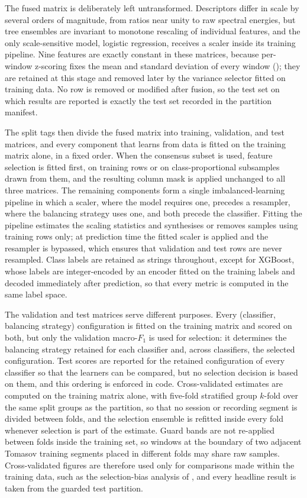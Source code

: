 The fused matrix is deliberately left untransformed. Descriptors differ in scale by several orders of magnitude, from ratios near unity to raw spectral energies, but tree ensembles are invariant to monotone rescaling of individual features, and the only scale-sensitive model, logistic regression, receives a scaler inside its training pipeline. Nine features are exactly constant in these matrices, because per-window z-scoring fixes the mean and standard deviation of every window (); they are retained at this stage and removed later by the variance selector fitted on training data. No row is removed or modified after fusion, so the test set on which results are reported is exactly the test set recorded in the partition manifest.

The split tags then divide the fused matrix into training, validation, and test matrices, and every component that learns from data is fitted on the training matrix alone, in a fixed order. When the consensus subset is used, feature selection is fitted first, on training rows or on class-proportional subsamples drawn from them, and the resulting column mask is applied unchanged to all three matrices. The remaining components form a single imbalanced-learning pipeline in which a scaler, where the model requires one, precedes a resampler, where the balancing strategy uses one, and both precede the classifier. Fitting the pipeline estimates the scaling statistics and synthesises or removes samples using training rows only; at prediction time the fitted scaler is applied and the resampler is bypassed, which ensures that validation and test rows are never resampled. Class labels are retained as strings throughout, except for XGBoost, whose labels are integer-encoded by an encoder fitted on the training labels and decoded immediately after prediction, so that every metric is computed in the same label space.

The validation and test matrices serve different purposes. Every (classifier, balancing strategy) configuration is fitted on the training matrix and scored on both, but only the validation macro-$F_1$ is used for selection: it determines the balancing strategy retained for each classifier and, across classifiers, the selected configuration. Test scores are reported for the retained configuration of every classifier so that the learners can be compared, but no selection decision is based on them, and this ordering is enforced in code. Cross-validated estimates are computed on the training matrix alone, with five-fold stratified group $k$-fold over the same split groups as the partition, so that no session or recording segment is divided between folds, and the selection ensemble is refitted inside every fold whenever selection is part of the estimate. Guard bands are not re-applied between folds inside the training set, so windows at the boundary of two adjacent Tomasov training segments placed in different folds may share raw samples. Cross-validated figures are therefore used only for comparisons made within the training data, such as the selection-bias analysis of , and every headline result is taken from the guarded test partition.

